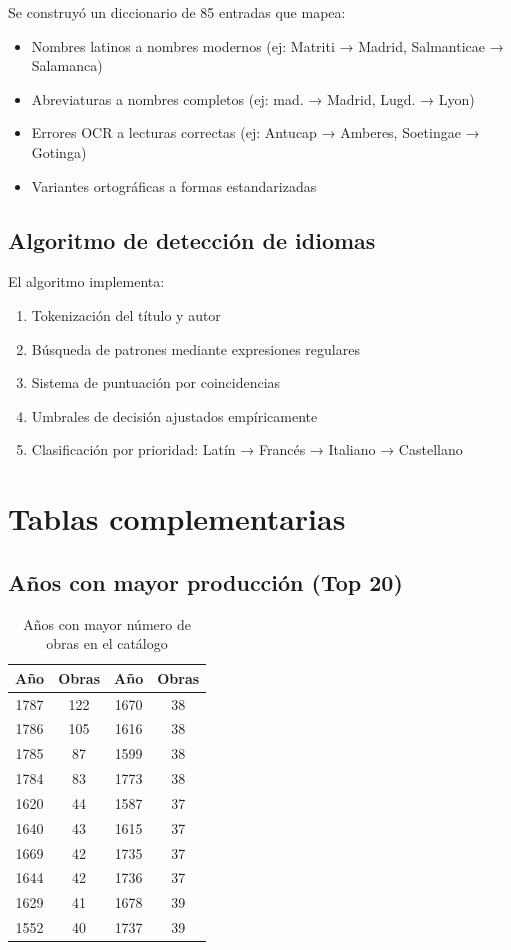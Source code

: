 \documentclass[12pt,a4paper]{article}
\begin{document}
Se construyó un diccionario de 85 entradas que mapea:

\begin{itemize}
    \item Nombres latinos a nombres modernos (ej: Matriti → Madrid, Salmanticae → Salamanca)
    \item Abreviaturas a nombres completos (ej: mad. → Madrid, Lugd. → Lyon)
    \item Errores OCR a lecturas correctas (ej: Antucap → Amberes, Soetingae → Gotinga)
    \item Variantes ortográficas a formas estandarizadas
\end{itemize}

\subsection{Algoritmo de detección de idiomas}

El algoritmo implementa:

\begin{enumerate}
    \item Tokenización del título y autor
    \item Búsqueda de patrones mediante expresiones regulares
    \item Sistema de puntuación por coincidencias
    \item Umbrales de decisión ajustados empíricamente
    \item Clasificación por prioridad: Latín → Francés → Italiano → Castellano
\end{enumerate}

\section{Tablas complementarias}

\subsection{Años con mayor producción (Top 20)}

\begin{table}[h]
\centering
\caption{Años con mayor número de obras en el catálogo}
\begin{tabular}{cccc}
\toprule
\textbf{Año} & \textbf{Obras} & \textbf{Año} & \textbf{Obras} \\
\midrule
1787 & 122 & 1670 & 38 \\
1786 & 105 & 1616 & 38 \\
1785 & 87 & 1599 & 38 \\
1784 & 83 & 1773 & 38 \\
1620 & 44 & 1587 & 37 \\
1640 & 43 & 1615 & 37 \\
1669 & 42 & 1735 & 37 \\
1644 & 42 & 1736 & 37 \\
1629 & 41 & 1678 & 39 \\
1552 & 40 & 1737 & 39 \\
\bottomrule
\end{tabular}
\end{table}
\end{document}
